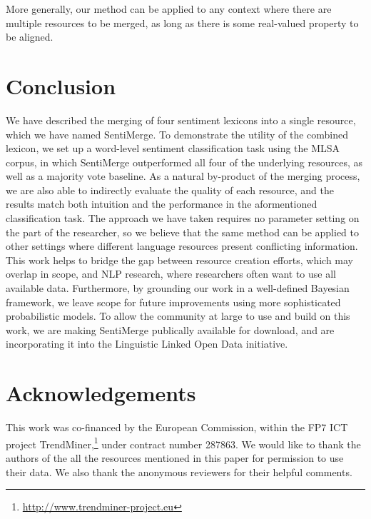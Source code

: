 \documentclass[11pt]{article}
\begin{document}
More generally, our method can be applied to any context where there are multiple resources to be merged, as long as there is some real-valued property to be aligned.


\section{Conclusion} \label{sec:conc}

We have described the merging of four sentiment lexicons into a single resource, which we have named SentiMerge.  To demonstrate the utility of the combined lexicon, we set up a word-level sentiment classification task using the MLSA corpus, in which SentiMerge outperformed all four of the underlying resources, as well as a majority vote baseline.  As a natural by-product of the merging process, we are also able to indirectly evaluate the quality of each resource, and the results match both intuition and the performance in the aformentioned classification task.  The approach we have taken requires no parameter setting on the part of the researcher, so we believe that the same method can be applied to other settings where different language resources present conflicting information.  This work helps to bridge the gap between resource creation efforts, which may overlap in scope, and NLP research, where researchers often want to use all available data.  Furthermore, by grounding our work in a well-defined Bayesian framework, we leave scope for future improvements using more sophisticated probabilistic models.  To allow the community at large to use and build on this work, we are making SentiMerge publically available for download, and are incorporating it into the Linguistic Linked Open Data initiative.


\section*{Acknowledgements}

This work was co-financed by the European Commission, within the FP7 ICT project TrendMiner,\footnote{\url{http://www.trendminer-project.eu}} under contract number 287863.  We would like to thank the authors of the all the resources mentioned in this paper for permission to use their data.  We also thank the anonymous reviewers for their helpful comments.



\end{document}
